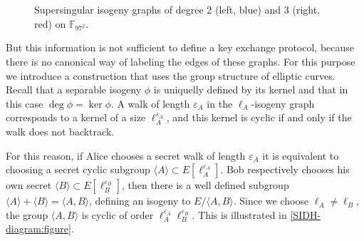 \documentclass{article}
\theoremstyle{theorem}
\theoremstyle{definition}
\begin{document}
\begin{figure}[h]
	\centering
	\caption{Supersingular isogeny graphs of degree 2 (left, blue) and 3
		(right, red) on $\mathbb{F}_{97^2}$.}
	\label{SIG97-2-3:figure}
\end{figure}

But this information is not sufficient to define a key exchange protocol, because there is no canonical way of labeling the edges of these graphs. For this purpose we introduce a construction that uses the group structure of elliptic curves. Recall that a separable isogeny $\phi$ is uniquelly defined by its kernel and that in this case $\deg\phi = \ker\phi$. A walk of length $\varepsilon_A$ in the $\ell_A$-isogeny graph corresponds to a kernel of a size $\ell_A^{\varepsilon_A}$, and this kernel is cyclic if and only if the walk does not backtrack.

For this reason, if Alice chooses a secret walk of length $\varepsilon_A$ it is equivalent to choosing a secret cyclic subgroup $\langle A \rangle \subset E[\ell_A^{\varepsilon_A}]$. Bob respectively chooses his own secret $\langle B \rangle \subset E[\ell_B^{\varepsilon_B}]$, then there is a well defined subgroup $\langle A \rangle + \langle B \rangle = \langle A, B \rangle$, defining an isogeny to $E/\langle A, B \rangle$. Since we choose $\ell_A \neq \ell_B$, the group $\langle A, B \rangle$ is cyclic of order $\ell_A^{\varepsilon_A} \ell_B^{\varepsilon_B}$. This is illustrated in \cref{SIDH-diagram:figure}.
\end{document}
